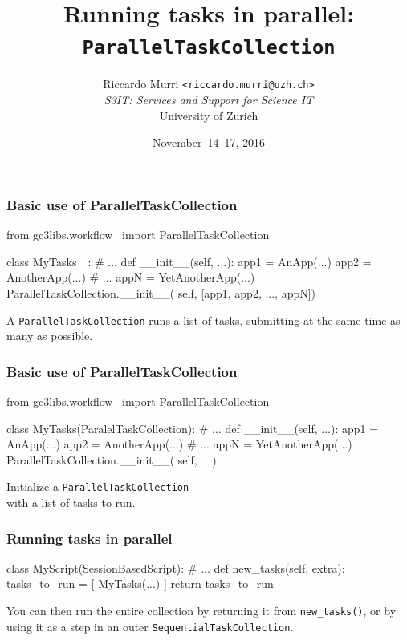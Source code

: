 \documentclass[english,serif,mathserif,xcolor=pdftex,dvipsnames,table]{beamer}
\title[Sequencing tasks]{%
  Running tasks in parallel: \\
  \texttt{ParallelTaskCollection}
}
\author[R. Murri, S3IT UZH]{%
  Riccardo Murri \texttt{<riccardo.murri@uzh.ch>}
  \\[1ex]
  \emph{S3IT: Services and Support for Science IT}
  \\[1ex]
  University of Zurich
}
\date{November~14--17, 2016}
\begin{document}
\maketitle


\begin{frame}[fragile]
  \frametitle{Basic use of ParallelTaskCollection}

\begin{python}
from gc3libs.workflow \
  import ParallelTaskCollection

class MyTasks~~:
  # ...
  def __init__(self, ...):
    app1 = AnApp(...)
    app2 = AnotherApp(...)
    # ...
    appN = YetAnotherApp(...)
    ParallelTaskCollection.__init__(
      self, [app1, app2, ..., appN])
\end{python}

  \+ A \texttt{ParallelTaskCollection} runs a list of tasks, submitting
  at the same time as many as possible.
\end{frame}


\begin{frame}[fragile]
  \frametitle{Basic use of ParallelTaskCollection}

\begin{python}
from gc3libs.workflow \
  import ParallelTaskCollection

class MyTasks(ParalelTaskCollection):
  # ...
  def __init__(self, ...):
    app1 = AnApp(...)
    app2 = AnotherApp(...)
    # ...
    appN = YetAnotherApp(...)
    ParallelTaskCollection.__init__(
      self, ~~)
\end{python}

  \+
  Initialize a \texttt{ParallelTaskCollection} \\
  with a list of tasks to run.
\end{frame}


\begin{frame}[fragile]
  \frametitle{Running tasks in parallel}

\begin{python}
class MyScript(SessionBasedScript):
  # ...
  def new_tasks(self, extra):
    tasks_to_run = [
      MyTasks(...)
    ]
    return tasks_to_run
\end{python}

  \+ You can then run the entire collection by returning it from
  \lstinline|new_tasks()|, or by using it as a step in an outer
  \texttt{SequentialTaskCollection}.
\end{frame}
\end{document}
